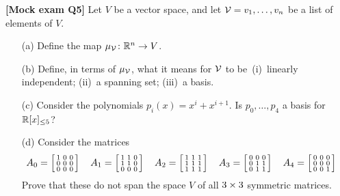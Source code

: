 \documentclass[a4paper]{article}
\begin{document}
\begin{problem}\textbf{[Mock exam Q5]}
 Let $V$ be a vector space, and let $\mathcal{V}=v_1,\dotsc,v_n$ be
 a list of elements of $V$.  
 \begin{itemize}
  \item[(a)] Define the map $\mu_{\mathcal{V}}\colon{\mathbb{R}}^n\to V$.
  \item[(b)] Define, in terms of $\mu_{\mathcal{V}}$, what it means
   for $\mathcal{V}$ to be~(i)~linearly independent; (ii)~a spanning
   set; (iii)~a basis.
  \item[(c)] Consider the polynomials $p_i(x)=x^i+x^{i+1}$.
   Is $p_0,\dotsc,p_4$ a basis for ${\mathbb{R}}[x]_{\leq 5}$?
  \item[(d)] Consider the matrices
   {\tiny \[
    A_0 = \left[\begin{smallmatrix} 1&0&0\\0&0&0\\0&0&0\end{smallmatrix}\right] \hspace{1em}
    A_1 = \left[\begin{smallmatrix} 1&1&0\\1&1&0\\0&0&0\end{smallmatrix}\right] \hspace{1em}
    A_2 = \left[\begin{smallmatrix} 1&1&1\\1&1&1\\1&1&1\end{smallmatrix}\right] \hspace{1em}
    A_3 = \left[\begin{smallmatrix} 0&0&0\\0&1&1\\0&1&1\end{smallmatrix}\right] \hspace{1em}
    A_4 = \left[\begin{smallmatrix} 0&0&0\\0&0&0\\0&0&1\end{smallmatrix}\right] \hspace{1em}
   \]}
   Prove that these do not span the space $V$ of all
   $3\times 3$ symmetric matrices.
 \end{itemize}
\end{problem}
\end{document}
